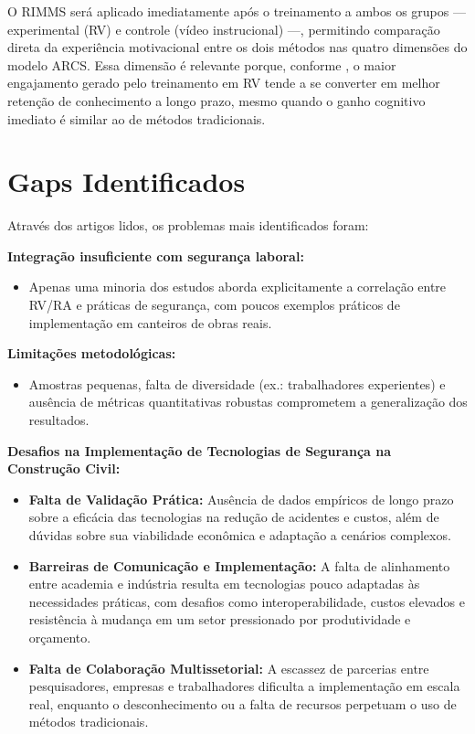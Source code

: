 O RIMMS será aplicado imediatamente após o treinamento a ambos os grupos — experimental (RV) e controle (vídeo instrucional) —, permitindo comparação direta da experiência motivacional entre os dois métodos nas quatro dimensões do modelo ARCS. Essa dimensão é relevante porque, conforme , o maior engajamento gerado pelo treinamento em RV tende a se converter em melhor retenção de conhecimento a longo prazo, mesmo quando o ganho cognitivo imediato é similar ao de métodos tradicionais.

\section{Gaps Identificados}

Através dos artigos lidos, os problemas mais identificados foram:

\textbf{Integração insuficiente com segurança laboral:}
\begin{itemize}
    \item Apenas uma minoria dos estudos aborda explicitamente a correlação entre RV/RA e práticas de segurança, com poucos exemplos práticos de implementação em canteiros de obras reais.
\end{itemize}

\textbf{Limitações metodológicas:}
\begin{itemize}
    \item Amostras pequenas, falta de diversidade (ex.: trabalhadores experientes) e ausência de métricas quantitativas robustas comprometem a generalização dos resultados.
\end{itemize}

\textbf{Desafios na Implementação de Tecnologias de Segurança na Construção Civil:}
\begin{itemize}
    \item \textbf{Falta de Validação Prática:} Ausência de dados empíricos de longo prazo sobre a eficácia das tecnologias na redução de acidentes e custos, além de dúvidas sobre sua viabilidade econômica e adaptação a cenários complexos.
    \item \textbf{Barreiras de Comunicação e Implementação:} A falta de alinhamento entre academia e indústria resulta em tecnologias pouco adaptadas às necessidades práticas, com desafios como interoperabilidade, custos elevados e resistência à mudança em um setor pressionado por produtividade e orçamento.
    \item \textbf{Falta de Colaboração Multissetorial:} A escassez de parcerias entre pesquisadores, empresas e trabalhadores dificulta a implementação em escala real, enquanto o desconhecimento ou a falta de recursos perpetuam o uso de métodos tradicionais.
\end{itemize}

